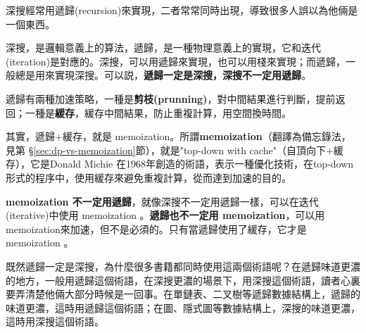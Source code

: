 深搜經常用遞歸(recursion)來實現，二者常常同時出現，導致很多人誤以為他倆是一個東西。

深搜，是邏輯意義上的算法，遞歸，是一種物理意義上的實現，它和迭代(iteration)是對應的。深搜，可以用遞歸來實現，也可以用棧來實現；而遞歸，一般總是用來實現深搜。可以説，\textbf{遞歸一定是深搜，深搜不一定用遞歸}。

遞歸有兩種加速策略，一種是\textbf{剪枝(prunning)}，對中間結果進行判斷，提前返回；一種是\textbf{緩存}，緩存中間結果，防止重複計算，用空間換時間。

其實，遞歸+緩存，就是 memoization。所謂\textbf{memoization}（翻譯為備忘錄法，見第 \S \ref{sec:dp-vs-memoization}節），就是"top-down with cache"（自頂向下+緩存），它是Donald Michie 在1968年創造的術語，表示一種優化技術，在top-down 形式的程序中，使用緩存來避免重複計算，從而達到加速的目的。

\textbf{memoization 不一定用遞歸}，就像深搜不一定用遞歸一樣，可以在迭代(iterative)中使用 memoization 。\textbf{遞歸也不一定用 memoization}，可以用memoization來加速，但不是必須的。只有當遞歸使用了緩存，它才是 memoization 。

既然遞歸一定是深搜，為什麼很多書籍都同時使用這兩個術語呢？在遞歸味道更濃的地方，一般用遞歸這個術語，在深搜更濃的場景下，用深搜這個術語，讀者心裏要弄清楚他倆大部分時候是一回事。在單鏈表、二叉樹等遞歸數據結構上，遞歸的味道更濃，這時用遞歸這個術語；在圖、隱式圖等數據結構上，深搜的味道更濃，這時用深搜這個術語。
